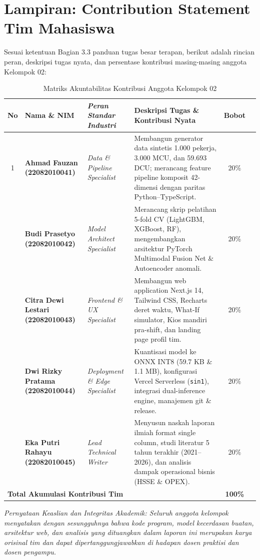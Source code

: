 \documentclass[a4paper,11pt]{article}
\begin{document}
\newpage
\section*{Lampiran: Contribution Statement Tim Mahasiswa}

Sesuai ketentuan Bagian 3.3 panduan tugas besar terapan, berikut adalah rincian peran, deskripsi tugas nyata, dan persentase kontribusi masing-masing anggota Kelompok 02:

\begin{table}[h!]
\centering
\small
\caption{Matriks Akuntabilitas Kontribusi Anggota Kelompok 02}
\label{tab:contribution_statement}
\begin{tabularx}{\textwidth}{c>{\bfseries}l>{\itshape}lXcc}
\toprule
\textbf{No} & \textbf{Nama \& NIM} & \textbf{Peran Standar Industri} & \textbf{Deskripsi Tugas \& Kontribusi Nyata} & \textbf{Bobot} \\
\midrule
1 & Ahmad Fauzan \newline (22082010041) & Data \& Pipeline Specialist & Membangun generator data sintetis 1.000 pekerja, 3.000 MCU, dan 59.693 DCU; merancang feature pipeline komposit 42-dimensi dengan paritas Python--TypeScript. & 20\% \\
\addlinespace
2 & Budi Prasetyo \newline (22082010042) & Model Architect Specialist & Merancang skrip pelatihan 5-fold CV (LightGBM, XGBoost, RF), mengembangkan arsitektur PyTorch Multimodal Fusion Net \& Autoencoder anomali. & 20\% \\
\addlinespace
3 & Citra Dewi Lestari \newline (22082010043) & Frontend \& UX Specialist & Membangun web application Next.js 14, Tailwind CSS, Recharts deret waktu, What-If simulator, Kios mandiri pra-shift, dan landing page profil tim. & 20\% \\
\addlinespace
4 & Dwi Rizky Pratama \newline (22082010044) & Deployment \& Edge Specialist & Kuantisasi model ke ONNX INT8 (59.7 KB \& 1.1 MB), konfigurasi Vercel Serverless (\texttt{sin1}), integrasi dual-inference engine, manajemen git \& release. & 20\% \\
\addlinespace
5 & Eka Putri Rahayu \newline (22082010045) & Lead Technical Writer & Menyusun naskah laporan ilmiah format single column, studi literatur 5 tahun terakhir (2021--2026), dan analisis dampak operasional bisnis (HSSE \& OPEX). & 20\% \\
\midrule
\multicolumn{4}{l}{\textbf{Total Akumulasi Kontribusi Tim}} & \textbf{100\%} \\
\bottomrule
\end{tabularx}
\end{table}

\noindent\textit{Pernyataan Keaslian dan Integritas Akademik: Seluruh anggota kelompok menyatakan dengan sesungguhnya bahwa kode program, model kecerdasan buatan, arsitektur web, dan analisis yang dituangkan dalam laporan ini merupakan karya orisinal tim dan dapat dipertanggungjawabkan di hadapan dosen praktisi dan dosen pengampu.}
\end{document}
